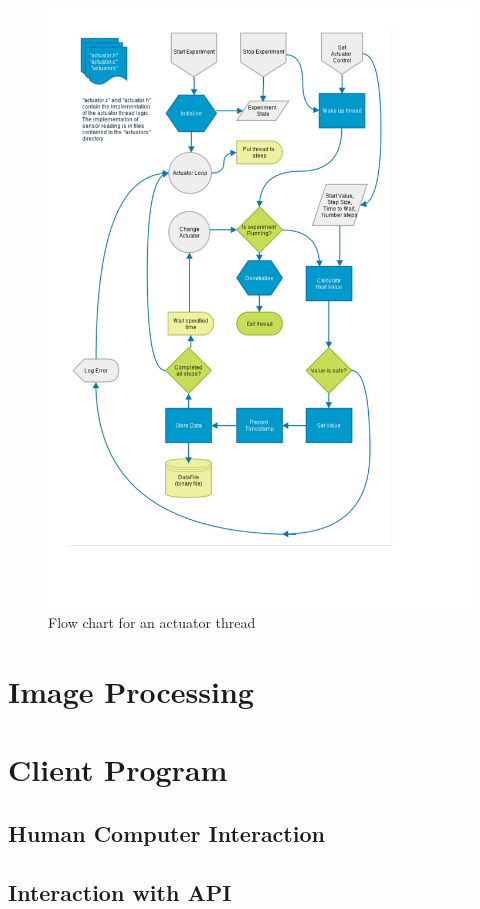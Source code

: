 \begin{figure}[H]
	\centering
	\includegraphics[width=1.1\textwidth]{figures/actuator_thread.pdf}
	\caption{Flow chart for an actuator thread} 
	\label{actuator_thread.pdf}
\end{figure}
\pagebreak

\section{Image Processing}

\section{Client Program}



\subsection{Human Computer Interaction}

\subsection{Interaction with API}










